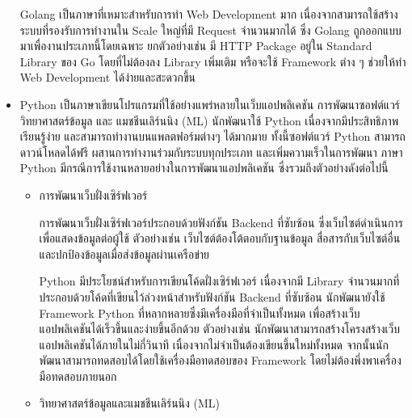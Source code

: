 \documentclass[12pt,oneside,openright,a4paper]{cpe-thai-project}
\begin{document}
\begin{itemize}
      \hspace{1cm}Golang เป็นภาษาที่เหมาะสำหรับการทำ Web Development มาก เนื่องจากสามารถใช้สร้างระบบที่รองรับการทำงานใน Scale ใหญ่ที่มี Request จำนวนมากได้ 
      ซึ่ง Golang ถูกออกแบบมาเพื่องานประเภทนี้โดยเฉพาะ ยกตัวอย่างเช่น มี HTTP Package อยู่ใน Standard Library ของ Go โดยที่ไม่ต้องลง Library เพิ่มเติม 
      หรือจะใช้ Framework ต่าง ๆ ช่วยให้ทำ Web Development ได้ง่ายและสะดวกขึ้น \cite{go}
      \item  Python
      \hspace{1cm}เป็นภาษาเขียนโปรแกรมที่ใช้อย่างแพร่หลายในเว็บแอปพลิเคชัน การพัฒนาซอฟต์แวร์ วิทยาศาสตร์ข้อมูล และ แมชชีนเลิร์นนิง (ML)
      นักพัฒนาใช้ Python เนื่องจากมีประสิทธิภาพ เรียนรู้ง่าย และสามารถทำงานบนแพลตฟอร์มต่างๆ ได้มากมาย ทั้งนี้ซอฟต์แวร์ Python สามารถดาวน์โหลดได้ฟรี 
      ผสานการทำงานร่วมกับระบบทุกประเภท และเพิ่มความเร็วในการพัฒนา 
      ภาษา Python มีกรณีการใช้งานหลายอย่างในการพัฒนาแอปพลิเคชัน ซึ่งรวมถึงตัวอย่างดังต่อไปนี้ \cite{python}
      \begin{itemize}
        \item การพัฒนาเว็บฝั่งเซิร์ฟเวอร์
        
        \hspace{1cm}การพัฒนาเว็บฝั่งเซิร์ฟเวอร์ประกอบด้วยฟังก์ชัน Backend ที่ซับซ้อน ซึ่งเว็บไซต์ดำเนินการเพื่อแสดงข้อมูลต่อผู้ใช้ 
        ตัวอย่างเช่น เว็บไซต์ต้องโต้ตอบกับฐานข้อมูล สื่อสารกับเว็บไซต์อื่น และปกป้องข้อมูลเมื่อส่งข้อมูลผ่านเครือข่าย 
        
        \hspace{1cm}Python มีประโยชน์สำหรับการเขียนโค้ดฝั่งเซิร์ฟเวอร์ เนื่องจากมี Library จำนวนมากที่ประกอบด้วยโค้ดที่เขียนไว้ล่วงหน้าสำหรับฟังก์ชัน Backend ที่ซับซ้อน 
        นักพัฒนายังใช้ Framework Python ที่หลากหลายซึ่งมีเครื่องมือที่จำเป็นทั้งหมด เพื่อสร้างเว็บแอปพลิเคชันได้เร็วขึ้นและง่ายขึ้นอีกด้วย ตัวอย่างเช่น นักพัฒนาสามารถสร้างโครงสร้างเว็บแอปพลิเคชันได้ภายในไม่กี่วินาที 
        เนื่องจากไม่จำเป็นต้องเขียนขึ้นใหม่ทั้งหมด จากนั้นนักพัฒนาสามารถทดสอบได้โดยใช้เครื่องมือทดสอบของ Framework โดยไม่ต้องพึ่งพาเครื่องมือทดสอบภายนอก
        \item วิทยาศาสตร์ข้อมูลและแมชชีนเลิร์นนิง (ML)
        

\end{itemize}
\end{itemize}
\end{document}
